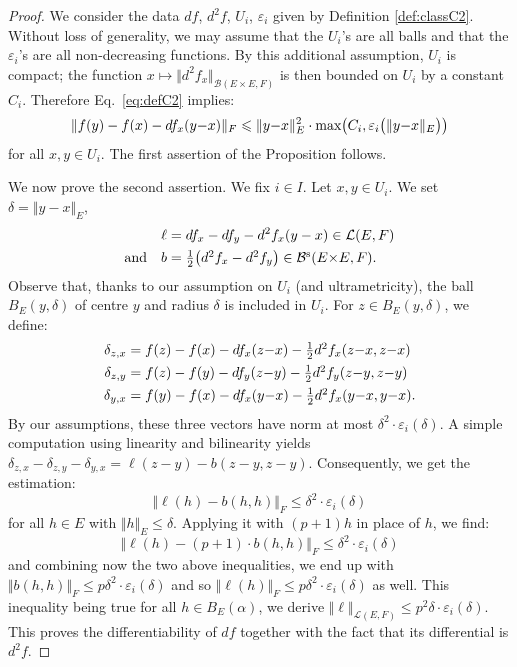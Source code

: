 \documentclass[11pt]{article}
\numberwithin{equation}{section}
\numberwithin{figure}{section}
\renewcommand{\leq}{\leqslant}
\theoremstyle{definition}
\newcommand{\calB}{\mathcal B}
\newcommand{\calL}{\mathcal L}
\renewcommand{\max}{\text{\rm max}}
\newcommand{\symm}{\text{\rm s}}
\begin{document}
\begin{proof}
We consider the data $df$, $d^2 f$, $U_i$, $\varepsilon_i$ given by 
Definition \ref{def:classC2}. Without loss of generality, we may assume 
that the $U_i$'s are all balls and that the $\varepsilon_i$'s are all 
non-decreasing functions. By this additional assumption, $U_i$ is
compact; the function $x \mapsto \Vert d^2 f_x \Vert_{\calB(E{\times}E,
F)}$ is then bounded on $U_i$ by a constant $C_i$. Therefore
Eq.~\eqref{eq:defC2} implies:
$$\Vert f(y) - f(x) - df_x(y{-}x) \Vert_F \leq 
\Vert y{-}x \Vert_E^2 \cdot \max\big(C_i, \varepsilon_i\big(\Vert y{-}x \Vert_E\big)\big)$$
for all $x,y \in U_i$. The first assertion of the Proposition follows.

We now prove the second assertion. We fix $i \in I$. Let $x,y \in U_i$. 
We set $\delta = \Vert y{-}x \Vert_E$,
\begin{align*}
\ell & = df_x - df_y - d^2 f_x(y-x) \in \calL(E,F) \\
\text{and} \quad
b & = \textstyle \frac 1 2 \big(d^2 f_x - d^2 f_y\big) \in \calB^\symm(E{\times}E, F).
\end{align*}
Observe that, thanks to our assumption on $U_i$ (and ultrametricity), 
the ball $B_E(y,\delta)$ of centre $y$ and radius $\delta$ is included 
in $U_i$. For $z \in B_E(y,\delta)$, we define:
\begin{align*}
\delta_{z,x} & \textstyle 
  = f(z) - f(x) - df_x(z{-}x) - \frac 1 2 d^2 f_x(z{-}x, z{-}x) \smallskip \\
\delta_{z,y} & \textstyle
  = f(z) - f(y) - df_y(z{-}y) - \frac 1 2 d^2 f_y(z{-}y, z{-}y) \smallskip \\
\delta_{y,x} & \textstyle
  = f(y) - f(x) - df_x(y{-}x) - \frac 1 2 d^2 f_x(y{-}x, y{-}x).
\end{align*}
By our assumptions, these three vectors have norm at most $\delta^2 
\cdot \varepsilon_i(\delta)$.
A simple computation using linearity and bilinearity yields 
$\delta_{z,x} - \delta_{z,y} - \delta_{y,x} = \ell(z{-}y) - 
b(z{-}y,z{-}y)$. Consequently, we get the estimation:
$$\Vert \ell(h) - b(h,h) \Vert_F \leq \delta^2 \cdot \varepsilon_i(\delta)$$
for all $h \in E$ with $\Vert h \Vert_E \leq \delta$. Applying it with
$(p{+}1)h$ in place of $h$, we find:
$$\Vert \ell(h) - (p{+}1) \cdot b(h,h) \Vert_F \leq \delta^2 \cdot \varepsilon_i(\delta)$$
and combining now the two above inequalities, we end up with
$\Vert b(h,h) \Vert_F \leq p \delta^2 \cdot \varepsilon_i(\delta)$ and
so $\Vert \ell(h) \Vert_F \leq p \delta^2 \cdot \varepsilon_i(\delta)$
as well. This inequality being true for all $h \in B_E(\alpha)$, we 
derive $\Vert \ell \Vert_{\calL(E,F)} \leq p^2 \delta \cdot 
\varepsilon_i(\delta)$. This proves the differentiability of $df$
together with the fact that its differential is $d^2 f$.
\end{proof}
\end{document}
